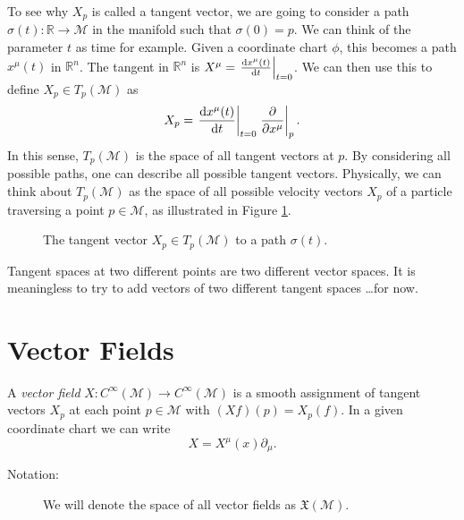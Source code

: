 To see why $X_p$ is called a tangent vector, we are going to consider a path $\sigma(t): \mathbb{R} \to \mathcal{M}$ in the manifold such that $\sigma(0) = p$. We can think of the parameter $t$ as time for example.
Given a coordinate chart $\phi$, this becomes a path $x^\mu(t)$ in $\mathbb{R}^n$. The tangent in $\mathbb{R}^n$ is $X^\mu = \left.\dv{x^\mu(t)}{t}\right\rvert_{t=0}$. We can then use this to define $X_p \in T_p(\mathcal{M})$ as
\begin{equation}
  X_p = \left.\dv{x^\mu(t)}{t}\right\rvert_{t = 0 } \left.\pdv{}{x^\mu}\right\rvert_p.
\end{equation}
In this sense, $T_p(\mathcal{M})$ is the space of all tangent vectors at $p$.
By considering all possible paths, one can describe all possible tangent vectors. Physically, we can think about $T_p(\mathcal{M})$ as the space of all possible velocity vectors $X_p$ of a particle traversing a point $p \in \mathcal{M}$, as illustrated in Figure \ref{fig:l2f2}.
\begin{figure}[tbhp]
  \centering
  \def\svgwidth{0.4\columnwidth}
  
  \caption{The tangent vector $X_p \in T_p(\mathcal{M})$ to a path $\sigma(t)$.}
  \label{fig:l2f2}
\end{figure}
\begin{leftbar}
  \begin{remark}
    Tangent spaces at two different points are two different vector spaces. It is meaningless to try to add vectors of two different tangent spaces \ldots for now.
  \end{remark}
\end{leftbar}

\section{Vector Fields}%
\label{sec:vector_fields}

\begin{definition}
  A \emph{vector field} $X\colon C^{\infty}(\mathcal{M}) \to C^{\infty}(\mathcal{M})$ is a smooth assignment of tangent vectors $X_p$ at each point $p \in \mathcal{M}$ with $(Xf)(p) = X_p (f)$. In a given coordinate chart we can write
  \begin{equation}
    X = X^\mu (x) \partial_\mu.
  \end{equation} 
\end{definition}
\begin{description}
  \item[Notation:] We will denote the space of all vector fields as $\mathfrak{X} (\mathcal{M})$.
\end{description}

